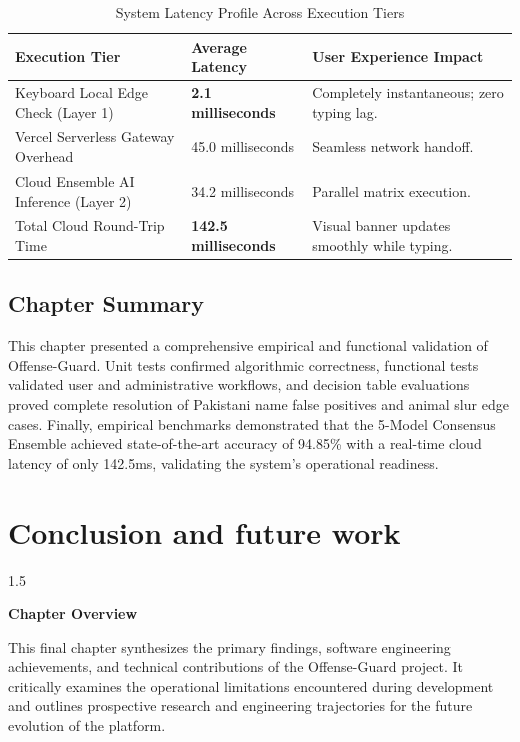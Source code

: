 \documentclass[A4paper,12pt]{report}
\theoremstyle{plain}
\theoremstyle{definition}
\theoremstyle{remark}
\numberwithin{equation}{section}
\begin{document}
\begin{table}[H]
\centering
\caption{System Latency Profile Across Execution Tiers}
\label{tab:latency_benchmarks}
\renewcommand{\arraystretch}{1.3}
\begin{tabular}{|p{5.5cm}|p{3.5cm}|p{5cm}|}
\hline
\textbf{Execution Tier} & \textbf{Average Latency} & \textbf{User Experience Impact} \\ \hline
Keyboard Local Edge Check (Layer 1) & \textbf{2.1 milliseconds} & Completely instantaneous; zero typing lag. \\ \hline
Vercel Serverless Gateway Overhead & 45.0 milliseconds & Seamless network handoff. \\ \hline
Cloud Ensemble AI Inference (Layer 2) & 34.2 milliseconds & Parallel matrix execution. \\ \hline
Total Cloud Round-Trip Time & \textbf{142.5 milliseconds} & Visual banner updates smoothly while typing. \\ \hline
\end{tabular}
\end{table}

\section{Chapter Summary}
This chapter presented a comprehensive empirical and functional validation of Offense-Guard. Unit tests confirmed algorithmic correctness, functional tests validated user and administrative workflows, and decision table evaluations proved complete resolution of Pakistani name false positives and animal slur edge cases. Finally, empirical benchmarks demonstrated that the 5-Model Consensus Ensemble achieved state-of-the-art accuracy of 94.85\% with a real-time cloud latency of only 142.5ms, validating the system's operational readiness.

\chapter{Conclusion and future work}
\thispagestyle{empty}
\newpage
\begin{spacing}{1.5}

\thispagestyle{empty}

{\centering \Large \bfseries Chapter Overview \par}
\vspace{1cm}

This final chapter synthesizes the primary findings, software engineering achievements, and technical contributions of the Offense-Guard project. It critically examines the operational limitations encountered during development and outlines prospective research and engineering trajectories for the future evolution of the platform.

\end{spacing}
\end{document}
